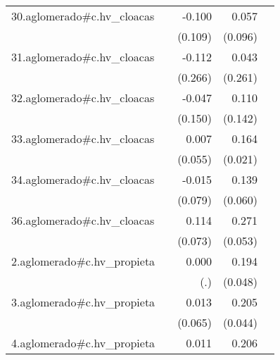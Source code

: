 {\begin{longtable}{l*{4}{D{.}{.}{-1}}}
\addlinespace
30.aglomerado#c.hv\_cloacas&                     &      -0.100         &       0.057         &                     \\
            &                     &     (0.109)         &     (0.096)         &                     \\
\addlinespace
31.aglomerado#c.hv\_cloacas&                     &      -0.112         &       0.043         &                     \\
            &                     &     (0.266)         &     (0.261)         &                     \\
\addlinespace
32.aglomerado#c.hv\_cloacas&                     &      -0.047         &       0.110         &                     \\
            &                     &     (0.150)         &     (0.142)         &                     \\
\addlinespace
33.aglomerado#c.hv\_cloacas&                     &       0.007         &       0.164\sym{***}&                     \\
            &                     &     (0.055)         &     (0.021)         &                     \\
\addlinespace
34.aglomerado#c.hv\_cloacas&                     &      -0.015         &       0.139\sym{*}  &                     \\
            &                     &     (0.079)         &     (0.060)         &                     \\
\addlinespace
36.aglomerado#c.hv\_cloacas&                     &       0.114         &       0.271\sym{***}&                     \\
            &                     &     (0.073)         &     (0.053)         &                     \\
\addlinespace
2.aglomerado#c.hv\_propieta&                     &       0.000         &       0.194\sym{***}&                     \\
            &                     &         (.)         &     (0.048)         &                     \\
\addlinespace
3.aglomerado#c.hv\_propieta&                     &       0.013         &       0.205\sym{***}&                     \\
            &                     &     (0.065)         &     (0.044)         &                     \\
\addlinespace
4.aglomerado#c.hv\_propieta&                     &       0.011         &       0.206\sym{***}&                     \\

\end{longtable}}
